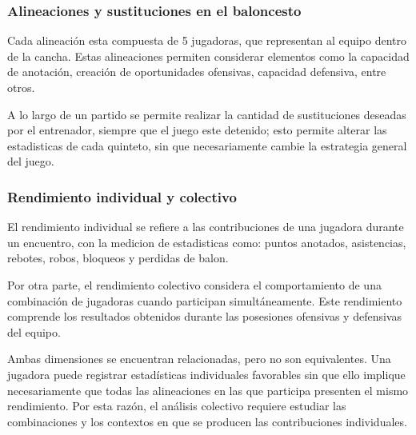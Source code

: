 \subsubsection{Alineaciones y sustituciones en el baloncesto}
Cada alineación esta compuesta de 5 jugadoras, que representan al equipo dentro de la cancha. Estas alineaciones permiten considerar elementos como la capacidad de anotación, creación de oportunidades ofensivas, capacidad defensiva, entre otros.

A lo largo de un partido se permite realizar la cantidad de sustituciones deseadas por el entrenador, siempre que el juego este detenido; esto permite alterar las estadisticas de cada quinteto, sin que necesariamente cambie la estrategia general del juego. \cite{wnba_faq}

\subsubsection{Rendimiento individual y colectivo}
El rendimiento individual se refiere a las contribuciones de una jugadora durante un encuentro, con la medicion de estadisticas como: puntos anotados, asistencias, rebotes, robos, bloqueos y perdidas de balon.

Por otra parte, el rendimiento colectivo considera el comportamiento de una combinación de jugadoras cuando participan simultáneamente. Este rendimiento comprende los resultados obtenidos durante las posesiones ofensivas y defensivas del equipo.

Ambas dimensiones se encuentran relacionadas, pero no son equivalentes. Una jugadora puede registrar estadísticas individuales favorables sin que ello implique necesariamente que todas las alineaciones en las que participa presenten el mismo rendimiento. Por esta razón, el análisis colectivo requiere estudiar las combinaciones y los contextos en que se producen las contribuciones individuales.